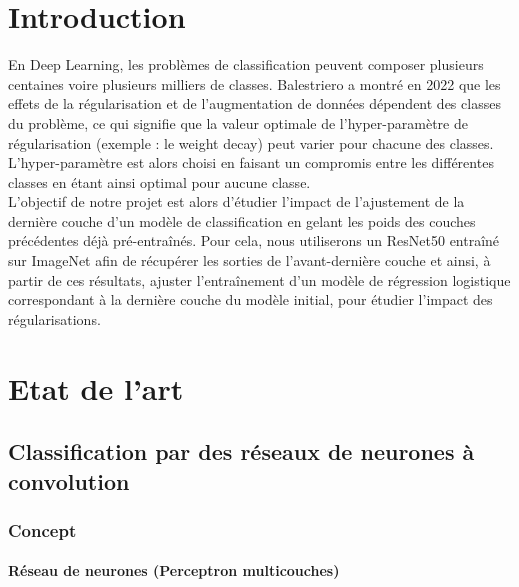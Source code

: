 \documentclass[12pt,english, openany]{book}
\begin{document}
\mainmatter

\chapter{Introduction}

En Deep Learning, les problèmes de classification peuvent composer plusieurs centaines voire plusieurs milliers de classes. Balestriero a montré en 2022 \cite{NEURIPS2022_f73c0453} que les effets de la régularisation et de l'augmentation de données dépendent des classes du problème, ce qui signifie que la valeur optimale de l'hyper-paramètre de régularisation (exemple : le weight decay) peut varier pour chacune des classes. L'hyper-paramètre est alors choisi en faisant un compromis entre les différentes classes en étant ainsi optimal pour aucune classe. \\

L'objectif de notre projet est alors d'étudier l'impact de l'ajustement de la dernière couche d'un modèle de classification en gelant les poids des couches précédentes déjà pré-entraînés. Pour cela, nous utiliserons un ResNet50 entraîné sur ImageNet afin de récupérer les sorties de l'avant-dernière couche et ainsi, à partir de ces résultats, ajuster l'entraînement d'un modèle de régression logistique correspondant à la dernière couche du modèle initial, pour étudier l'impact des régularisations.

\chapter{Etat de l'art}
\section{Classification par des réseaux de neurones à convolution}
\subsection{Concept}

\subsubsection{Réseau de neurones (Perceptron multicouches)}
\label{subsubsec:ANN}
\end{document}
